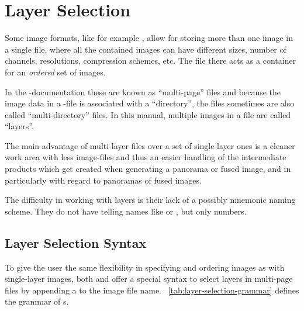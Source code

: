 

\section[Layer Selection\commonpart]{\label{sec:layer-selection}%
  Layer Selection\commonpart}

Some image formats, like for example , allow for storing more than one image in a
single file, where all the contained images can have different sizes, number of channels,
resolutions, compression schemes, etc.  The file there acts as a container for an \emph{ordered}
set of images.

%
%
%
%
%
In the -documentation these are known as ``multi-page'' files and because the
image data in a -file is associated with a ``directory'', the files sometimes are
also called ``multi-directory'' files.  In this manual, multiple images in a file are called
``layers''.

The main advantage of multi-layer files over a set of single-layer ones is a cleaner work area
with less image-files and thus an easier handling of the intermediate products which get created
when generating a panorama or fused image, and in particularly with regard to panoramas of fused
images.

The difficulty in working with layers is their lack of a possibly mnemonic naming scheme.  They
do not have telling names like  or , but only
numbers.


\subsection[Layer Selection Syntax]{\label{sec:layer-selection-syntax}%
  Layer Selection Syntax}

To give the user the same flexibility in specifying and ordering images as with single-layer
images, both \App{} and \OtherApp{} offer a special syntax to select layers in multi-page files
by appending a  to the image file name.
\tableName~\ref{tab:layer-selection-grammar} defines the grammar of
\/s.

